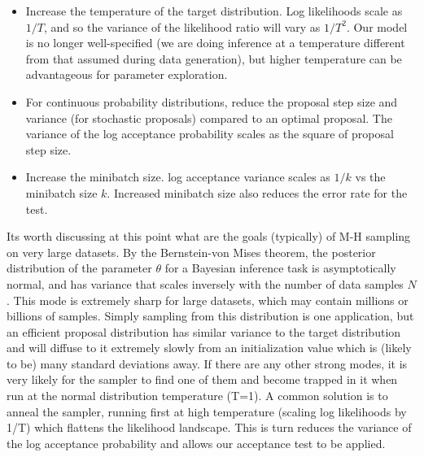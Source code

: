 \documentclass{article}
\begin{document}
\begin{itemize}
  
\item Increase the temperature of the target distribution. Log likelihoods
  scale as $1/T$, and so the variance of the likelihood ratio will
  vary as $1/T^2$. Our model is no longer well-specified (we are doing inference
  at a temperature different from that assumed during data generation), but
  higher temperature can be advantageous for parameter exploration.

\item For continuous probability distributions, reduce the proposal
  step size and variance (for stochastic proposals) compared to an optimal
  proposal. The variance of the log acceptance probability scales as the
  square of proposal step size. 

\item Increase the minibatch size. log acceptance variance scales as $1/k$ vs the
  minibatch size $k$. Increased minibatch size also reduces the error rate for
  the test. 

\end{itemize}

Its worth discussing at this point what are the goals (typically) of
M-H sampling on very large datasets.  By the Bernstein-von Mises
theorem, the posterior distribution of the parameter $\theta$ for a
Bayesian inference task is asymptotically normal, and has variance
that scales inversely with the number of data samples $N$. This mode
is extremely sharp for large datasets, which may contain millions or
billions of samples. Simply sampling from this distribution is one
application, but an efficient proposal distribution
\cite{OptimalScaling01} has similar variance to the target
distribution and will diffuse to it extremely slowly from an
initialization value which is (likely to be) many standard deviations
away. If there are any other strong modes, it is very likely for the
sampler to find one of them and become trapped in it when run at the
normal distribution temperature (T=1). A common solution is to anneal
the sampler, running first at high temperature (scaling log
likelihoods by 1/T) which flattens the likelihood landscape.  This is
turn reduces the variance of the log acceptance probability and allows
our acceptance test to be applied.
\end{document}
